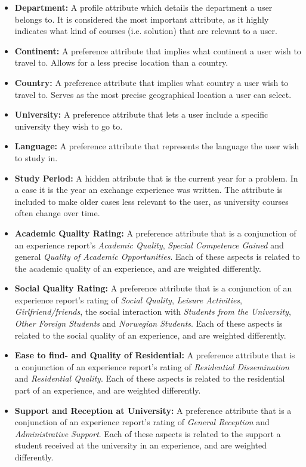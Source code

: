 \begin{itemize}
\item \textbf{Department:} A profile attribute which details the department a user belongs to. It is considered the most important attribute, as it highly indicates what kind of courses (i.e. solution) that are relevant to a user. 

\item \textbf{Continent:} A preference attribute that implies what continent a user wish to travel to. Allows for a less precise location than a country.

\item \textbf{Country:} A preference attribute that implies what country a user wish to travel to. Serves as the most precise geographical location a user can select.

\item \textbf{University:} A preference attribute that lets a user include a specific university they wish to go to.

\item \textbf{Language:} A preference attribute that represents the language the user wish to study in.

\item \textbf{Study Period:} A hidden attribute that is the current year for a problem. In a case it is the year an exchange experience was written. The attribute is included to make older cases less relevant to the user, as university courses often change over time.

\item \textbf{Academic Quality Rating:} A preference attribute that is a conjunction of an experience report's \emph{Academic Quality}, \emph{Special Competence Gained} and general \emph{Quality of Academic Opportunities}. Each of these aspects is related to the academic quality of an experience, and are weighted differently.

\item \textbf{Social Quality Rating:} A preference attribute that is a conjunction of an experience report's rating of  \emph{Social Quality}, \emph{Leisure Activities}, \emph{Girlfriend/friends}, the social interaction with \emph{Students from the University}, \emph{Other Foreign Students} and \emph{Norwegian Students}. Each of these aspects is related to the social quality of an experience, and are weighted differently.

\item \textbf{Ease to find- and Quality of Residential:} A preference attribute that is a conjunction of an experience report's rating of \emph{Residential Dissemination} and \emph{Residential Quality}. Each of these aspects is related to the residential part of an experience, and are weighted differently.

\item \textbf{Support and Reception at University:} A preference attribute that is a conjunction of an experience report's rating of \emph{General Reception} and \emph{Administrative Support}. Each of these aspects is related to the support a student received at the university in an experience, and are weighted differently.
\end{itemize}


